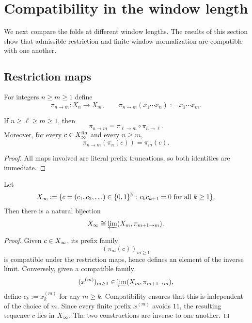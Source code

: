 \section{Compatibility in the window length}

We next compare the folds at different window lengths.  The results of this
section show that admissible restriction and finite-window normalization are
compatible with one another.

\subsection{Restriction maps}

\begin{definition}
\label{def:prefix-restriction}
For integers $n\ge m\ge 1$ define
\[
\pi_{n\to m}:X_n\to X_m,
\qquad
\pi_{n\to m}(x_1\cdots x_n):=x_1\cdots x_m.
\]
\end{definition}

\begin{lemma}
\label{lem:pi-functorial}
If $n\ge \ell\ge m\ge 1$, then
\[
\pi_{n\to m}=\pi_{\ell\to m}\circ \pi_{n\to \ell}.
\]
Moreover, for every $c\in X_\infty^{\mathrm{fin}}$ and every $n\ge m$,
\[
\pi_{n\to m}(\pi_n(c))=\pi_m(c).
\]
\end{lemma}

\begin{proof}
All maps involved are literal prefix truncations, so both identities are
immediate.
\end{proof}

\begin{theorem}
\label{thm:inverse-limit-golden}
Let
\[
X_\infty
:=
\{c=(c_1,c_2,\ldots)\in\{0,1\}^{\mathbb{N}}:c_kc_{k+1}=0\text{ for all }k\ge 1\}.
\]
Then there is a natural bijection
\[
X_\infty\cong \varprojlim (X_m,\pi_{m+1\to m}).
\]
\end{theorem}

\begin{proof}
Given $c\in X_\infty$, its prefix family
\[
(\pi_m(c))_{m\ge 1}
\]
is compatible under the restriction maps, hence defines an element of the
inverse limit.  Conversely, given a compatible family
\[
(x^{(m)})_{m\ge 1}\in \varprojlim (X_m,\pi_{m+1\to m}),
\]
define $c_k:=x_k^{(m)}$ for any $m\ge k$.  Compatibility ensures that this is
independent of the choice of $m$.  Since every finite prefix $x^{(m)}$ avoids
$11$, the resulting sequence $c$ lies in $X_\infty$.  The two constructions are
inverse to one another.
\end{proof}

